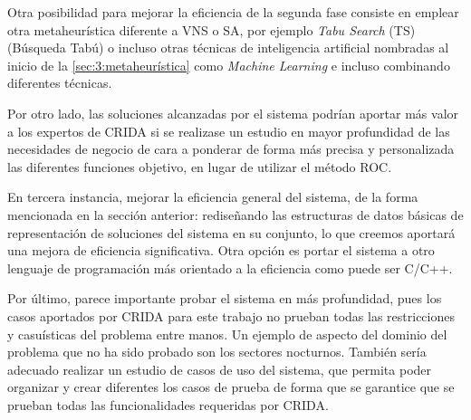 Otra posibilidad para mejorar la eficiencia de la segunda fase consiste en emplear otra metaheurística diferente a VNS o SA, por ejemplo \textit{Tabu Search} (TS) (Búsqueda Tabú) o incluso otras técnicas de inteligencia artificial nombradas al inicio de la \autoref{sec:3:metaheurística} como \textit{Machine Learning} e incluso combinando diferentes técnicas.

Por otro lado, las soluciones alcanzadas por el sistema podrían aportar más valor a los expertos de CRIDA si se realizase un estudio en mayor profundidad de las necesidades de negocio de cara a ponderar de forma más precisa y personalizada las diferentes funciones objetivo, en lugar de utilizar el método ROC.

En tercera instancia, mejorar la eficiencia general del sistema, de la forma mencionada en la sección anterior: rediseñando las estructuras de datos básicas de representación de soluciones del sistema en su conjunto, lo que creemos aportará una mejora de eficiencia significativa. Otra opción es portar el sistema a otro lenguaje de programación más orientado a la eficiencia como puede ser C/C++. 

Por último, parece importante probar el sistema en más profundidad, pues los casos aportados por CRIDA para este trabajo no prueban todas las restricciones y casuísticas del problema entre manos. Un ejemplo de aspecto del dominio del problema que no ha sido probado son los sectores nocturnos. También sería adecuado realizar un estudio de casos de uso del sistema, que permita poder organizar y crear diferentes los casos de prueba de forma que se garantice que se prueban todas las funcionalidades requeridas por CRIDA.
